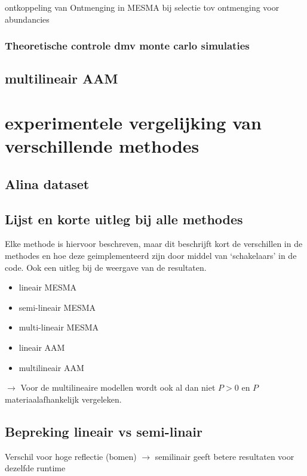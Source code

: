 \documentclass[12pt]{report}
\begin{document}
ontkoppeling van Ontmenging in MESMA bij selectie tov ontmenging voor abundancies

\subsection{Theoretische controle dmv monte carlo simulaties}

\section{multilineair AAM}

\chapter{experimentele vergelijking van verschillende methodes}

\section{Alina dataset}

\section{Lijst en korte uitleg bij alle methodes}

Elke methode is hiervoor beschreven, maar dit beschrijft kort de verschillen in de methodes en hoe deze geimplementeerd zijn door middel van `schakelaars' in de code. Ook een uitleg bij de weergave van de resultaten. 

\begin{itemize}
\item lineair MESMA
\item semi-lineair MESMA
\item multi-lineair MESMA
\item lineair AAM
\item multilineair AAM
\end{itemize}

$\rightarrow$ Voor de multilineaire modellen wordt ook al dan niet $P> 0$ en $P$ materiaalafhankelijk vergeleken.



\section{Bepreking lineair vs semi-linair}

Verschil voor hoge reflectie (bomen)
$\rightarrow$ semilinair geeft betere resultaten voor dezelfde runtime
\end{document}

